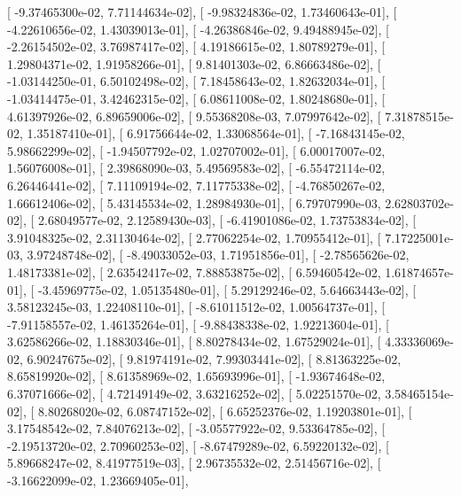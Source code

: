 \documentclass{article}
\begin{document}
       [ -9.37465300e-02,   7.71144634e-02],
       [ -9.98324836e-02,   1.73460643e-01],
       [ -4.22610656e-02,   1.43039013e-01],
       [ -4.26386846e-02,   9.49488945e-02],
       [ -2.26154502e-02,   3.76987417e-02],
       [  4.19186615e-02,   1.80789279e-01],
       [  1.29804371e-02,   1.91958266e-01],
       [  9.81401303e-02,   6.86663486e-02],
       [ -1.03144250e-01,   6.50102498e-02],
       [  7.18458643e-02,   1.82632034e-01],
       [ -1.03414475e-01,   3.42462315e-02],
       [  6.08611008e-02,   1.80248680e-01],
       [  4.61397926e-02,   6.89659006e-02],
       [  9.55368208e-03,   7.07997642e-02],
       [  7.31878515e-02,   1.35187410e-01],
       [  6.91756644e-02,   1.33068564e-01],
       [ -7.16843145e-02,   5.98662299e-02],
       [ -1.94507792e-02,   1.02707002e-01],
       [  6.00017007e-02,   1.56076008e-01],
       [  2.39868090e-03,   5.49569583e-02],
       [ -6.55472114e-02,   6.26446441e-02],
       [  7.11109194e-02,   7.11775338e-02],
       [ -4.76850267e-02,   1.66612406e-02],
       [  5.43145534e-02,   1.28984930e-01],
       [  6.79707990e-03,   2.62803702e-02],
       [  2.68049577e-02,   2.12589430e-03],
       [ -6.41901086e-02,   1.73753834e-02],
       [  3.91048325e-02,   2.31130464e-02],
       [  2.77062254e-02,   1.70955412e-01],
       [  7.17225001e-03,   3.97248748e-02],
       [ -8.49033052e-03,   1.71951856e-01],
       [ -2.78565626e-02,   1.48173381e-02],
       [  2.63542417e-02,   7.88853875e-02],
       [  6.59460542e-02,   1.61874657e-01],
       [ -3.45969775e-02,   1.05135480e-01],
       [  5.29129246e-02,   5.64663443e-02],
       [  3.58123245e-03,   1.22408110e-01],
       [ -8.61011512e-02,   1.00564737e-01],
       [ -7.91158557e-02,   1.46135264e-01],
       [ -9.88438338e-02,   1.92213604e-01],
       [  3.62586266e-02,   1.18830346e-01],
       [  8.80278434e-02,   1.67529024e-01],
       [  4.33336069e-02,   6.90247675e-02],
       [  9.81974191e-02,   7.99303441e-02],
       [  8.81363225e-02,   8.65819920e-02],
       [  8.61358969e-02,   1.65693996e-01],
       [ -1.93674648e-02,   6.37071666e-02],
       [  4.72149149e-02,   3.63216252e-02],
       [  5.02251570e-02,   3.58465154e-02],
       [  8.80268020e-02,   6.08747152e-02],
       [  6.65252376e-02,   1.19203801e-01],
       [  3.17548542e-02,   7.84076213e-02],
       [ -3.05577922e-02,   9.53364785e-02],
       [ -2.19513720e-02,   2.70960253e-02],
       [ -8.67479289e-02,   6.59220132e-02],
       [  5.89668247e-02,   8.41977519e-03],
       [  2.96735532e-02,   2.51456716e-02],
       [ -3.16622099e-02,   1.23669405e-01],
\end{document}
